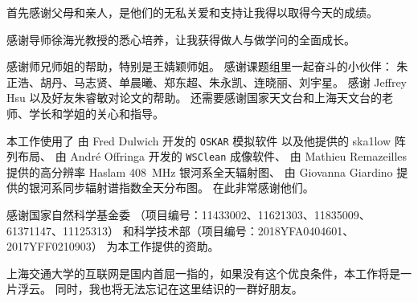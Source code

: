 
\begin{thanks}

首先感谢父母和亲人，是他们的无私关爱和支持让我得以取得今天的成绩。

感谢导师徐海光教授的悉心培养，让我获得做人与做学问的全面成长。

感谢师兄师姐的帮助，特别是王婧颖师姐。
感谢课题组里一起奋斗的小伙伴：
朱正浩、胡丹、马志贤、单晨曦、郑东超、朱永凯、连晓丽、刘宇星。
感谢 Jeffrey Hsu 以及好友朱睿敏对论文的帮助。
还需要感谢国家天文台和上海天文台的老师、学长和学姐的关心和指导。

本工作使用了
由 Fred Dulwich 开发的 \texttt{OSKAR} 模拟软件
以及他提供的 \acs{ska1low} 阵列布局、
由 André Offringa 开发的 \texttt{WSClean} 成像软件、
由 Mathieu Remazeilles 提供的高分辨率 Haslam \SI{408}{\MHz}
银河系全天辐射图、
由 Giovanna Giardino 提供的银河系同步辐射谱指数全天分布图。
在此非常感谢他们。

感谢国家自然科学基金委
（项目编号：11433002、11621303、11835009、61371147、11125313）
和科学技术部（项目编号：2018YFA0404601、2017YFF0210903）
为本工作提供的资助。

上海交通大学的互联网是国内首屈一指的，如果没有这个优良条件，本工作将是一片浮云。
同时，我也将无法忘记在这里结识的一群好朋友。


\end{thanks}
